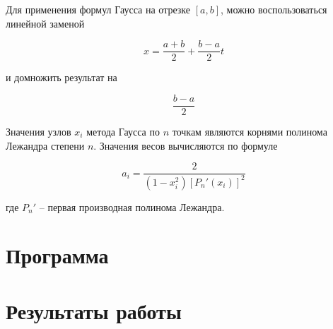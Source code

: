 \documentclass[12pt, a4paper]{article}
\begin{document}
Для применения формул Гаусса на отрезке $[a, b]$, можно воспользоваться 
линейной заменой

\begin{equation}
	x = \frac{a + b}{2} + \frac{b - a}{2} t
	\label{eqn:zamena}
\end{equation}

и домножить результат на 

$$\frac{b-a}{2}$$


Значения узлов $x_i$ метода Гаусса по $n$ точкам являются корнями полинома Лежандра
степени $n$. Значения весов вычисляются по формуле 

\begin{equation}
	a_i = \frac{2}{(1 - x_i^2)[P_n'(x_i)]^2}
	\label{eqn:gauss_a}
\end{equation}

где $P_n'$ -- первая производная полинома Лежандра.

\section{Программа}



\section{Результаты работы}
\end{document}
